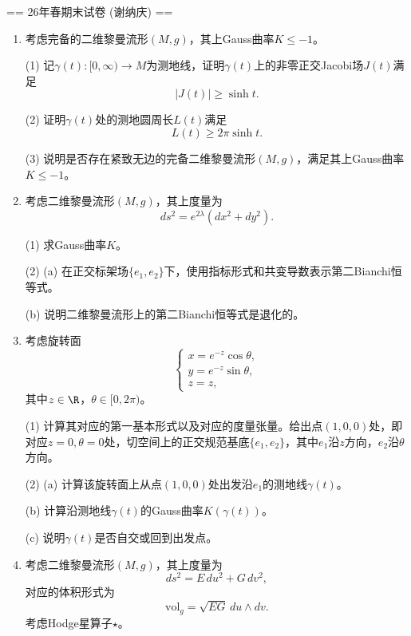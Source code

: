 
== 26年春期末试卷 (谢纳庆) ==

\begin{enumerate}
    \item 考虑完备的二维黎曼流形$(M,g)$，其上Gauss曲率$K\leq -1$。

    (1) 记$\gamma(t):[0,\infty)\to M$为测地线，证明$\gamma(t)$上的非零正交Jacobi场$J(t)$满足
    $$|J(t)|\geq \sinh t.$$

    (2) 证明$\gamma(t)$处的测地圆周长$L(t)$满足
    $$L(t)\geq 2\pi\sinh t.$$

    (3) 说明是否存在紧致无边的完备二维黎曼流形$(M,g)$，满足其上Gauss曲率$K\leq -1$。

    \item 考虑二维黎曼流形$(M,g)$，其上度量为
    $$ds^2=e^{2\lambda}(dx^2+dy^2).$$

    (1) 求Gauss曲率$K$。

    (2) (a) 在正交标架场$\{e_1,e_2\}$下，使用指标形式和共变导数表示第二Bianchi恒等式。

    (b) 说明二维黎曼流形上的第二Bianchi恒等式是退化的。

    \item 考虑旋转面
    $$\begin{cases}
        x=e^{-z}\cos\theta,\\
        y=e^{-z}\sin\theta,\\
        z=z,
    \end{cases}$$
    其中$z\in\R$，$\theta\in[0,2\pi)$。

    (1) 计算其对应的第一基本形式以及对应的度量张量。给出点$(1,0,0)$处，即对应$z=0,\theta=0$处，切空间上的正交规范基底$\{e_1,e_2\}$，其中$e_1$沿$z$方向，$e_2$沿$\theta$方向。

    (2) (a) 计算该旋转面上从点$(1,0,0)$处出发沿$e_1$的测地线$\gamma(t)$。

    (b) 计算沿测地线$\gamma(t)$的Gauss曲率$K(\gamma(t))$。

    (c) 说明$\gamma(t)$是否自交或回到出发点。

    \item 考虑二维黎曼流形$(M,g)$，其上度量为
    $$ds^2=E\,du^2+G\,dv^2,$$
    对应的体积形式为
    $$\mathrm{vol}_g=\sqrt{EG}\,du\wedge dv.$$
    考虑Hodge星算子$\star$。


\end{enumerate}

